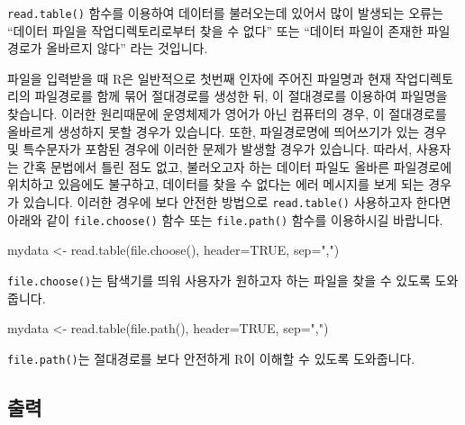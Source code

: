 \documentclass{report}
\begin{document}
\texttt{read.table()} 함수를 이용하여 데이터를 불러오는데 있어서 많이 발생되는 오류는 ``데이터 파일을 작업디렉토리로부터 찾을 수 없다'' 또는 ``데이터 파일이 존재한 파일경로가 올바르지 않다'' 라는 것입니다. 

파일을 입력받을 때 R은 일반적으로 첫번째 인자에 주어진 파일명과 현재 작업디렉토리의 파일경로를 함께 묶어 절대경로를 생성한 뒤, 이 절대경로를 이용하여 파일명을 찾습니다. 
이러한 원리때문에 운영체제가 영어가 아닌 컴퓨터의 경우, 이 절대경로를 올바르게 생성하지 못할 경우가 있습니다. 
또한, 파일경로명에 띄어쓰기가 있는 경우 및 특수문자가 포함된 경우에 이러한 문제가 발생할 경우가 있습니다. 
따라서, 사용자는 간혹 문법에서 틀린 점도 없고, 불러오고자 하는 데이터 파일도 올바른 파일경로에 위치하고 있음에도 불구하고, 데이터를 찾을 수 없다는 에러 메시지를 보게 되는 경우가 있습니다. 
이러한 경우에 보다 안전한 방법으로 \texttt{read.table()} 사용하고자 한다면 아래와 같이 \texttt{file.choose()} 함수 또는 \texttt{file.path()} 함수를 이용하시길 바랍니다.

\begin{Schunk}
\begin{Soutput}
mydata <- read.table(file.choose(), header=TRUE, sep=",")
\end{Soutput}
\end{Schunk}

\texttt{file.choose()}는 탐색기를 띄워 사용자가 원하고자 하는 파일을 찾을 수 있도록 도와줍니다. 

\begin{Schunk}
\begin{Soutput}
mydata <- read.table(file.path(), header=TRUE, sep=",")
\end{Soutput}
\end{Schunk}

\texttt{file.path()}는 절대경로를 보다 안전하게 R이 이해할 수 있도록 도와줍니다. 





\subsection{출력}


% 
\end{document}
